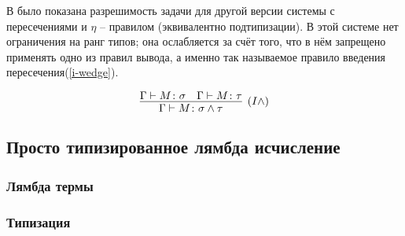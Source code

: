\documentclass[../main.tex]{subfiles}
\begin{document}
В \cite{kurata_1995} было показана разрешимость задачи для другой версии системы с пересечениями и $\eta$ -- правилом (эквивалентно подтипизации). В этой системе нет ограничения на ранг типов; она ослабляется за счёт того, что в нём запрещено применять одно из правил вывода, а именно так называемое правило введения пересечения(\ref{i-wedge}).

\begin{equation} \label{i-wedge}
\infer[(I\wedge)]{\Gamma \vdash M \colon \sigma \wedge \tau}{\Gamma \vdash M \colon \sigma & \Gamma \vdash M \colon \tau}
\end{equation}




\subsection{Просто типизированное лямбда исчисление}

\subsubsection{Лямбда термы}
\subsubsection{Типизация}
\end{document}
